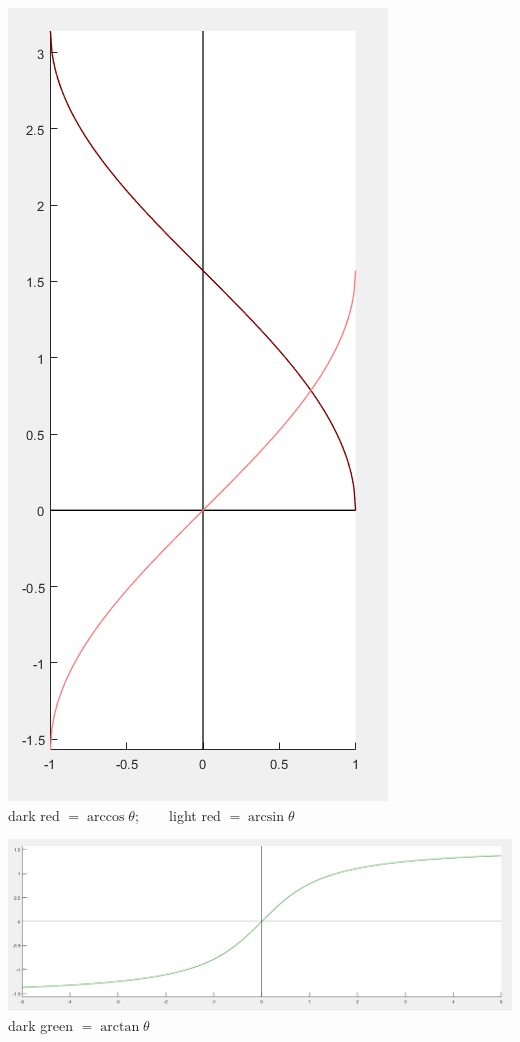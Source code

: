 \documentclass{article}
\begin{document}
\parbox{0.5\textwidth}{
\includegraphics[scale = 0.5]{arccos_and_arcsin.png} \\
dark red \(= \arccos\theta\); ~~~ light red \(= \arcsin\theta\)
} 

\parbox{0.5\textwidth}{
\includegraphics[scale = 0.3]{arctan.png} \\
dark green \(= \arctan\theta\)
} 
\end{document}
